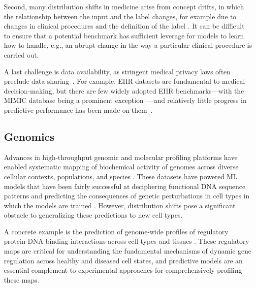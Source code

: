 Second, many distribution shifts in medicine arise from concept drifts, in which the relationship between the input and the label changes, for example due to changes in clinical procedures and the definition of the label \citep{widmer1996learning,beyene2015improved,futoma2020myth}. It can be difficult to ensure that a potential benchmark has sufficient leverage for models to learn how to handle, e.g., an abrupt change in the way a particular clinical procedure is carried out.

A last challenge is data availability, as stringent medical privacy laws often preclude data sharing~\citep{price2019privacy}. For example, EHR datasets are fundamental to medical decision-making, but there are few widely adopted EHR benchmarks---with the MIMIC database being a prominent exception~\citep{johnson2016mimic}---and relatively little progress in predictive performance has been made on them~\citep{bellamy2020evaluating}.

\subsection{Genomics}\label{sec:genomics}
Advances in high-throughput genomic and molecular profiling platforms have enabled systematic mapping of biochemical activity of genomes across diverse cellular contexts, populations, and species
\citep{encode2012integrated,ho2014comparative,kundaje2015integrative,
aviv2017human,hubmap2019human,moore2020expanded,gtex2020gtex}.
These datasets have powered ML models that have been fairly successful at deciphering functional DNA sequence patterns and predicting the consequences of genetic perturbations in cell types in which the models are trained \citep{libbrecht2015machine,zhou2015predicting,kelley2016basset,ching2018opportunities,eraslan2019deep,jaganathan2019predicting,avsec2021base}.
However, distribution shifts pose a significant obstacle to generalizing these predictions to new cell types.

A concrete example is the prediction of genome-wide profiles of regulatory protein-DNA binding interactions across cell types and tissues \citep{srivastava2020sequence}.
These regulatory maps are critical for understanding the fundamental mechanisms of dynamic gene regulation across healthy and diseased cell states, and predictive models are an essential complement to experimental approaches for comprehensively profiling these maps.

